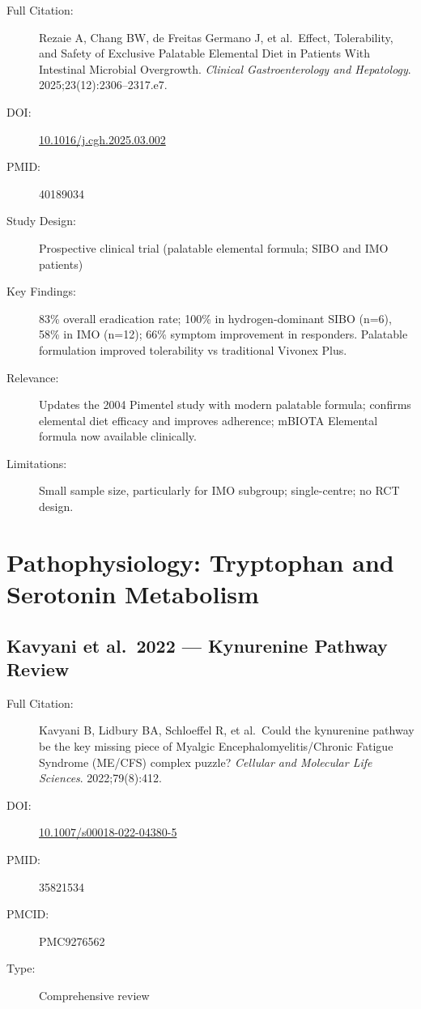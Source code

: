 \begin{description}
    \item[Full Citation:] Rezaie A, Chang BW, de Freitas Germano J, et al.\ Effect, Tolerability, and Safety of Exclusive Palatable Elemental Diet in Patients With Intestinal Microbial Overgrowth. \textit{Clinical Gastroenterology and Hepatology}. 2025;23(12):2306--2317.e7.
    \item[DOI:] \href{https://doi.org/10.1016/j.cgh.2025.03.002}{10.1016/j.cgh.2025.03.002}
    \item[PMID:] 40189034
    \item[Study Design:] Prospective clinical trial (palatable elemental formula; SIBO and IMO patients)
    \item[Key Findings:] 83\% overall eradication rate; 100\% in hydrogen-dominant SIBO (n=6), 58\% in IMO (n=12); 66\% symptom improvement in responders. Palatable formulation improved tolerability vs traditional Vivonex Plus.
    \item[Relevance:] Updates the 2004 Pimentel study with modern palatable formula; confirms elemental diet efficacy and improves adherence; mBIOTA Elemental formula now available clinically.
    \item[Limitations:] Small sample size, particularly for IMO subgroup; single-centre; no RCT design.
\end{description}

\section{Pathophysiology: Tryptophan and Serotonin Metabolism}
\label{sec:bib-tryptophan}

\subsection{Kavyani et al.\ 2022 --- Kynurenine Pathway Review}

\begin{description}
    \item[Full Citation:] Kavyani B, Lidbury BA, Schloeffel R, et al.\ Could the kynurenine pathway be the key missing piece of Myalgic Encephalomyelitis/Chronic Fatigue Syndrome (ME/CFS) complex puzzle? \textit{Cellular and Molecular Life Sciences}. 2022;79(8):412.
    \item[DOI:] \href{https://doi.org/10.1007/s00018-022-04380-5}{10.1007/s00018-022-04380-5}
    \item[PMID:] 35821534
    \item[PMCID:] PMC9276562
    \item[Type:] Comprehensive review
\end{description}

